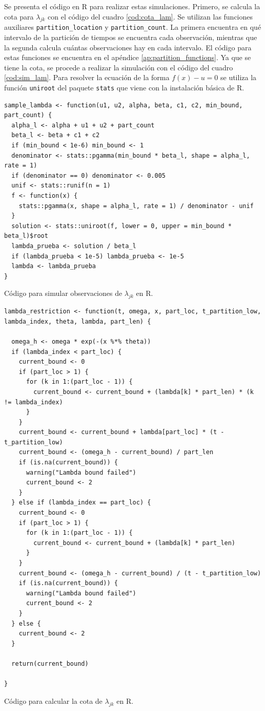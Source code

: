 \documentclass[11pt,a4paper]{article}
\begin{document}
Se presenta el código en R para realizar estas simulaciones. Primero, se calcula la cota para $\lambda_{jk}$ con el código del cuadro \ref{cod:cota_lam}. Se utilizan las funciones auxiliares \texttt{partition\_location} y \texttt{partition\_count}. La primera encuentra en qué intervalo de la partición de tiempos se encuentra cada observación, mientras que la segunda calcula cuántas observaciones hay en cada intervalo. El código para estas funciones se encuentra en el apéndice \ref{ap:partition_functions}. Ya que se tiene la cota, se procede a realizar la simulación con el código del cuadro \ref{cod:sim_lam}. Para resolver la ecuación de la forma $f(x) - u = 0$ se utiliza la función \texttt{uniroot} del paquete \texttt{stats} que viene con la instalación básica de R.

\begin{table}[!htb]
\begin{lstlisting}
sample_lambda <- function(u1, u2, alpha, beta, c1, c2, min_bound, part_count) {
  alpha_l <- alpha + u1 + u2 + part_count
  beta_l <- beta + c1 + c2
  if (min_bound < 1e-6) min_bound <- 1
  denominator <- stats::pgamma(min_bound * beta_l, shape = alpha_l, rate = 1)
  if (denominator == 0) denominator <- 0.005
  unif <- stats::runif(n = 1)
  f <- function(x) {
    stats::pgamma(x, shape = alpha_l, rate = 1) / denominator - unif
  }
  solution <- stats::uniroot(f, lower = 0, upper = min_bound * beta_l)$root
  lambda_prueba <- solution / beta_l
  if (lambda_prueba < 1e-5) lambda_prueba <- 1e-5
  lambda <- lambda_prueba
}
\end{lstlisting}
\caption{Código para simular observaciones de $\lambda_{jk}$ en R.}
\label{cod:sim_lam}
\end{table}

\begin{table}[!htb]
\begin{lstlisting}
lambda_restriction <- function(t, omega, x, part_loc, t_partition_low, lambda_index, theta, lambda, part_len) {

  omega_h <- omega * exp(-(x %*% theta))
  if (lambda_index < part_loc) {
    current_bound <- 0
    if (part_loc > 1) {
      for (k in 1:(part_loc - 1)) {
        current_bound <- current_bound + (lambda[k] * part_len) * (k != lambda_index)
      }
    }
    current_bound <- current_bound + lambda[part_loc] * (t - t_partition_low)
    current_bound <- (omega_h - current_bound) / part_len
    if (is.na(current_bound)) {
      warning("Lambda bound failed")
      current_bound <- 2
    }
  } else if (lambda_index == part_loc) {
    current_bound <- 0
    if (part_loc > 1) {
      for (k in 1:(part_loc - 1)) {
        current_bound <- current_bound + (lambda[k] * part_len)
      }
    }
    current_bound <- (omega_h - current_bound) / (t - t_partition_low)
    if (is.na(current_bound)) {
      warning("Lambda bound failed")
      current_bound <- 2
    }
  } else {
    current_bound <- 2
  }

  return(current_bound)

}
\end{lstlisting}
\caption{Código para calcular la cota de $\lambda_{jk}$ en R.}
\label{cod:cota_lam}
\end{table}
\end{document}
